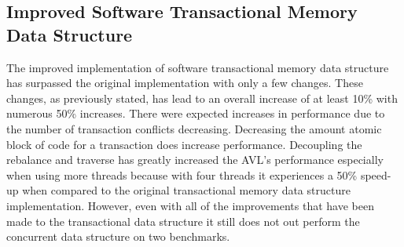 \documentclass[conference]{IEEEtran}
\begin{document}
\subsection{Improved Software Transactional Memory Data Structure}
The improved implementation of software transactional memory data structure has surpassed the original implementation with only a few changes. These changes, as previously stated, has lead to an overall increase of at least 10\% with numerous 50\% increases. There were expected increases in performance due to the number of transaction conflicts decreasing. Decreasing the amount atomic block of code for a transaction does increase performance. Decoupling the rebalance and traverse has greatly increased the AVL's performance especially when using more threads because with four threads it experiences a 50\% speed-up when compared to the original transactional memory data structure implementation. However, even with all of the improvements that have been made to the transactional data structure it still does not out perform the concurrent data structure on two benchmarks.
\end{document}
